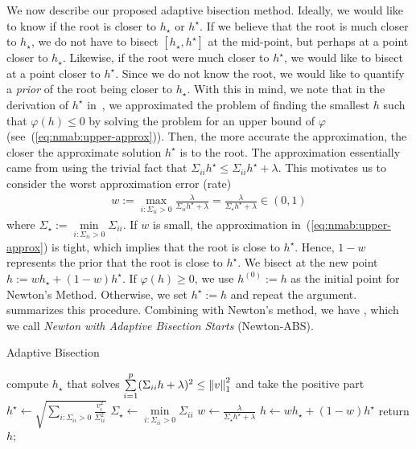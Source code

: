 We now describe our proposed adaptive bisection method.
Ideally, we would like to know if the root is closer to $h_\star$ or $h^\star$.
If we believe that the root is much closer to $h_\star$,
we do not have to bisect $[h_\star, h^\star]$ at the mid-point, 
but perhaps at a point closer to $h_\star$.
Likewise, if the root were much closer to $h^\star$, 
we would like to bisect at a point closer to $h^\star$.
Since we do not know the root, we would like to quantify a \emph{prior} of 
the root being closer to $h_\star$.
With this in mind, we note that in the derivation of $h^\star$
in~, we 
approximated the problem of finding the smallest $h$ such that $\varphi(h) \leq 0$
by solving the problem for an upper bound of $\varphi$ (see~(\ref{eq:nmab:upper-approx})).
Then, the more accurate the approximation, the closer the approximate solution $h^\star$ is to the root.
The approximation essentially came from using the trivial fact that $\Sigma_{ii} h^\star \leq \Sigma_{ii} h^\star + \lambda$.
This motivates us to consider the worst approximation error (rate)
\begin{align*}
    w
    := 
    \max\limits_{i: \Sigma_{ii} > 0} \frac{\lambda}{\Sigma_{ii} h^\star + \lambda}
    =
    \frac{\lambda}{\Sigma_\star h^\star + \lambda}
    \in 
    (0,1)
\end{align*}
where $\Sigma_\star := \min\limits_{i : \Sigma_{ii} > 0} \Sigma_{ii}$.
If $w$ is small, the approximation in~(\ref{eq:nmab:upper-approx}) is tight,
which implies that the root is close to $h^\star$.
Hence, $1-w$ represents the prior that the root is close to $h^\star$.
We bisect at the new point $h := wh_\star + (1-w)h^\star$.
If $\varphi(h) \geq 0$, we use $h^{(0)} := h$ as the initial point for Newton's Method.
Otherwise, we set $h^\star := h$ and repeat the argument.
 summarizes this procedure.
Combining  with Newton's method,
we have ,
which we call \emph{Newton with Adaptive Bisection Starts} (Newton-ABS).

\begin{algorithm}[t]
    \caption{Adaptive Bisection}\label{alg:nabs:ab}
    compute $h_\star$ that solves
    $
        \sum\limits_{i=1}^p
        (\Sigma_{ii} h + \lambda)^2
        \leq
        \left\|v\right\|_1^2
    $ and take the positive part\;
    $
        h^\star
        \gets
        \sqrt{
            \sum\limits_{i: \Sigma_{ii} > 0} \frac{v_i^2}{\Sigma_{ii}^2}
        }
    $\;
    $\Sigma_\star \gets \min\limits_{i : \Sigma_{ii} > 0} \Sigma_{ii}$\;
    $w \gets \frac{\lambda}{\Sigma_\star h^\star + \lambda}$\;
    $h \gets wh_\star + (1-w)h^\star$\;
    return $h$;
\end{algorithm}

